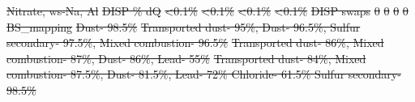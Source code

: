 \documentclass[
  letterpaper,
  DIV=11,
  numbers=noendperiod]{scrartcl}
\makeatletter
\renewenvironment{table}%
   {\renewcommand\familydefault\sfdefault
    \@float{table}}
   {\end@float}
\providecommand{\DIFdel}[1]{{\protect\color{red}\sout{#1}}}                      %
\providecommand{\DIFdelFL}[1]{\DIFdel{#1}} %
\providecommand{\DIFaddbeginFL}{} %
\providecommand{\DIFdelendFL}{} %
\newcommand{\DIFaddincludegraphics}[2][]{{\color{blue}\fbox{\DIFOincludegraphics[#1]{#2}}}} %
\DeclareRobustCommand{\DIFaddbeginFL}{\DIFOaddbeginFL \let\includegraphics\DIFaddincludegraphics} %
\DeclareRobustCommand{\DIFdelendFL}{\DIFOaddendFL \let\includegraphics\DIFOincludegraphics} %
\makeatother
\begin{document}
\begin{table}
\DIFdelFL{Nitrate, ws-Na, Al}%
\DIFdelFL{DISP \% dQ }%
\DIFdelFL{<0.1\% }%
\DIFdelFL{<0.1\% }%
\DIFdelFL{<0.1\% }%
\DIFdelFL{<0.1\%}%
\DIFdelFL{DISP swaps }%
\DIFdelFL{0 }%
\DIFdelFL{0 }%
\DIFdelFL{0 }%
\DIFdelFL{0}%
\DIFdelFL{BS\_mapping }%
\DIFdelFL{Dust- 98.5\% }%
\DIFdelFL{Transported dust- 95\%, Dust- 96.5\%, Sulfur secondary- 97.5\%, Mixed combustion- 96.5\% }%
\DIFdelFL{Transported dust- 86\%, Mixed combustion- 87\%, Dust- 86\%, Lead- 55\% }%
\DIFdelFL{Transported dust- 84\%, Mixed combustion- 87.5\%, Dust- 81.5\%, Lead- 72\%
Chloride- 61.5\%
Sulfur secondary- 98.5\%}%
\DIFdelendFL \DIFaddbeginFL \centering{

}
\end{table}
\end{document}
